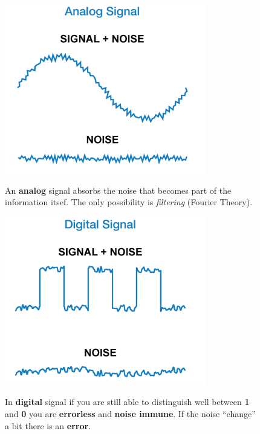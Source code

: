 \begin{figure}[h]
    \centering
    \begin{minipage}[t]{0.45\textwidth}
        \centering
        \includegraphics[width=\textwidth]{img/emi_analog}

        \begin{flushleft}
            An \textbf{analog} signal absorbs the noise that becomes part of the information itsef. The only possibility is \textit{filtering} (Fourier Theory).
        \end{flushleft}
    \end{minipage}
    \begin{minipage}[t]{0.45\textwidth}
        \centering
        \includegraphics[width=\textwidth]{img/emi_digital}

        \begin{flushleft}
            In \textbf{digital} signal if you are still able to distinguish well between \textbf{1} and \textbf{0} you are \textbf{errorless} and \textbf{noise immune}. If the noise ``change'' a bit there is an \textbf{error}.
        \end{flushleft}
    \end{minipage}
\end{figure}
